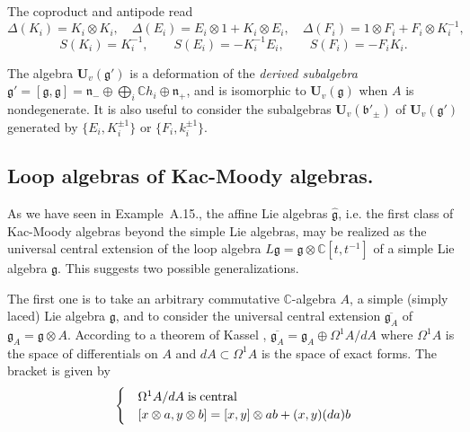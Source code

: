 \documentclass[a4paper,10pt]{amsart}
\def\U{\mathbf{U}}
\def\C{\mathbb{C}}
\def\g{\mathfrak{g}}
\def\bo{\mathfrak{b}}
\def\n{\mathfrak{n}}
\numberwithin{equation}{section}
\begin{document}
{The coproduct and antipode read
\begin{equation}\label{E:standardcoproduct}
\Delta(K_i)=K_i \otimes K_i, \quad \Delta(E_i)=E_i \otimes 1 + K_i \otimes E_i, \quad \Delta(F_i)=1\otimes F_i + F_i \otimes K_i^{-1} ,
\end{equation}
$$S(K_i)=K_i^{-1}, \qquad S(E_i)=-K_i^{-1}E_i, \qquad S(F_i)=-F_iK_i.$$

\vspace{.1in}

The algebra $\U_v(\g')$ is a deformation of the \textit{derived subalgebra} $\g'=[\g,\g]=
\n_- \oplus \bigoplus_i \C h_i \oplus \n_+$, and is isomorphic to $\U_v(\g)$ when $A$ is nondegenerate. It is also useful to consider the subalgebras $\U_v(\bo'_{\pm})$ of $\U_v(\g')$ generated by $\{E_i, K_i^{\pm 1}\}$ or $\{F_i, k_i^{\pm 1}\}$.

\vspace{.2in}

\subsection{Loop algebras of Kac-Moody algebras.}

\vspace{.15in}

As we have seen in Example~A.15., the affine Lie algebras $\widehat{\g}$, i.e. the first class
of Kac-Moody algebras beyond the simple Lie algebras, may be realized as the universal central extension of the loop algebra $L\g=\g \otimes \C[t,t^{-1}]$ of a simple Lie algebra $\g$. This suggests two possible generalizations.

\vspace{.05in}

The first one is to take an arbitrary commutative $\C$-algebra $A$, a simple (simply laced) Lie algebra $\g$, and to consider the universal central extension $\overline{\g_A}$ of $\g_{A}=\g \otimes A$. According to a theorem of Kassel \cite{Kassel},
$\overline{\g_A}=\g_A \oplus \Omega^1A/dA$ where $\Omega^1A$ is the space of differentials on $A$ and $dA \subset\Omega^1A$ is the space of exact forms. The bracket is given by
$$\begin{cases}
&\Omega^1A/dA \; \text{is\;central} \\
&[x \otimes a,y\otimes b]=[x,y]\otimes ab+ (x,y) (da)b
\end{cases}$$

}
\end{document}
